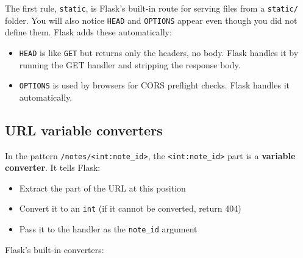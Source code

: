 \noindent{}The first rule, \texttt{static}, is Flask's built-in route for serving files from a \texttt{static/} folder. You will also notice \texttt{HEAD} and \texttt{OPTIONS} appear even though you did not define them. Flask adds these automatically:

\begin{itemize}
\tightlist
\item
  \texttt{HEAD} is like \texttt{GET} but returns only the headers, no body. Flask handles it by running the GET handler and stripping the response body.
\item
  \texttt{OPTIONS} is used by browsers for CORS preflight checks. Flask handles it automatically.
\end{itemize}

\subsection*{URL variable converters}\label{04-request-handling-paths:url-variable-converters}

In the pattern \texttt{/}\allowbreak{}\texttt{notes/}\allowbreak{}\texttt{\textless{}int:note\_id\textgreater{}}, the \texttt{\textless{}int:note\_id\textgreater{}} part is a \textbf{variable converter}. It tells Flask:

\begin{itemize}
\tightlist
\item
  Extract the part of the URL at this position
\item
  Convert it to an \texttt{int} (if it cannot be converted, return 404)
\item
  Pass it to the handler as the \texttt{note\_id} argument
\end{itemize}

\noindent{}Flask's built-in converters:


